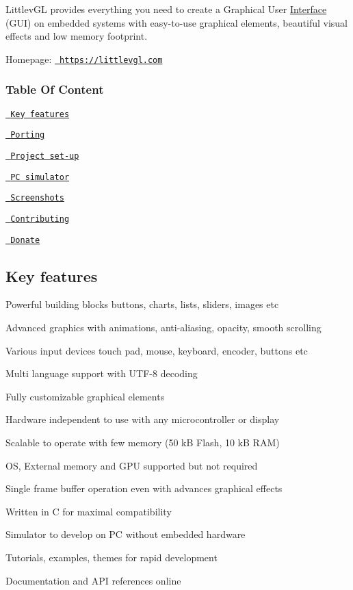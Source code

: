 

Littlev\+GL provides everything you need to create a Graphical User \mbox{\hyperlink{classInterface}{Interface}} (G\+UI) on embedded systems with easy-\/to-\/use graphical elements, beautiful visual effects and low memory footprint.

Homepage\+: \href{https://littlevgl.com}{\texttt{ https\+://littlevgl.\+com}}

\subsubsection*{Table Of Content}


\begin{DoxyItemize}
\item \href{\#key-features}{\texttt{ Key features}}
\item \href{\#porting}{\texttt{ Porting}}
\item \href{\#project-set-up}{\texttt{ Project set-\/up}}
\item \href{\#pc-simulator}{\texttt{ PC simulator}}
\item \href{\#screenshots}{\texttt{ Screenshots}}
\item \href{\#contributing}{\texttt{ Contributing}}
\item \href{\#donate}{\texttt{ Donate}}
\end{DoxyItemize}

\subsection*{Key features}


\begin{DoxyItemize}
\item Powerful building blocks buttons, charts, lists, sliders, images etc
\item Advanced graphics with animations, anti-\/aliasing, opacity, smooth scrolling
\item Various input devices touch pad, mouse, keyboard, encoder, buttons etc
\item Multi language support with U\+T\+F-\/8 decoding
\item Fully customizable graphical elements
\item Hardware independent to use with any microcontroller or display
\item Scalable to operate with few memory (50 kB Flash, 10 kB R\+AM)
\item OS, External memory and G\+PU supported but not required
\item Single frame buffer operation even with advances graphical effects
\item Written in C for maximal compatibility
\item Simulator to develop on PC without embedded hardware
\item Tutorials, examples, themes for rapid development
\item Documentation and A\+PI references online
\end{DoxyItemize}

